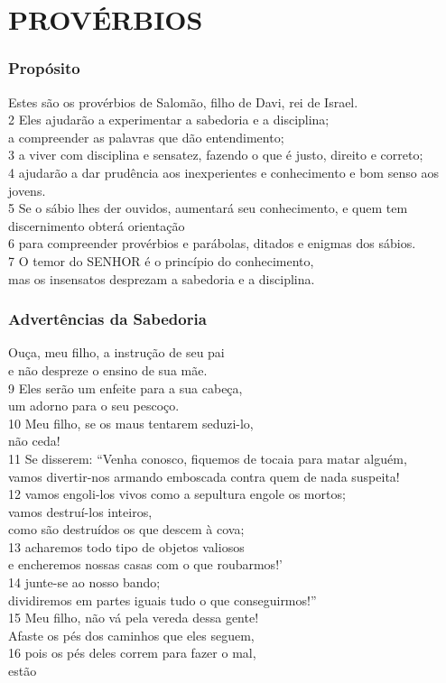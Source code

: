 \chapter*{\LARGE PROVÉRBIOS}
\begin{multicols}{2}
\subsection*{\textbf{Propósito}}

 Estes são os provérbios de Salomão, filho de Davi, rei de Israel.\\
2 Eles ajudarão a experimentar a sabedoria e a disciplina;\\
a compreender as palavras que dão entendimento;\\
3 a viver com disciplina e sensatez, fazendo o que é justo, direito e correto;\\
4 ajudarão a dar prudência aos inexperientes e conhecimento e bom senso aos jovens.\\
5 Se o sábio lhes der ouvidos, aumentará seu conhecimento, e quem tem discernimento obterá orientação\\
6 para compreender provérbios e parábolas, ditados e enigmas dos sábios.\\
7 O temor do SENHOR é o princípio do conhecimento,\\
mas os insensatos desprezam a sabedoria e a disciplina.

\subsection*{Advertências da Sabedoria}

 Ouça, meu filho, a instrução de seu pai\\ e não despreze o ensino de sua mãe.\\
9 Eles serão um enfeite para a sua cabeça,\\ um adorno para o seu pescoço.\\
10 Meu filho, se os maus tentarem seduzi-lo,\\ não ceda!\\
11 Se disserem: ``Venha conosco, fiquemos de tocaia para matar alguém,\\ vamos divertir-nos armando emboscada contra quem de nada suspeita!\\ 12 vamos engoli-los vivos como a sepultura engole os mortos;\\ vamos destruí-los inteiros,\\ como são destruídos os que descem à cova;\\ 13 acharemos todo tipo de objetos valiosos\\ e encheremos nossas casas com o que roubarmos!'\\ 14 junte-se ao nosso bando;\\ dividiremos em partes iguais tudo o que conseguirmos!''\\
15 Meu filho, não vá pela vereda dessa gente!\\ Afaste os pés dos caminhos que eles seguem,\\ 
16 pois os pés deles correm para fazer o mal,\\ estão 
\end{multicols}